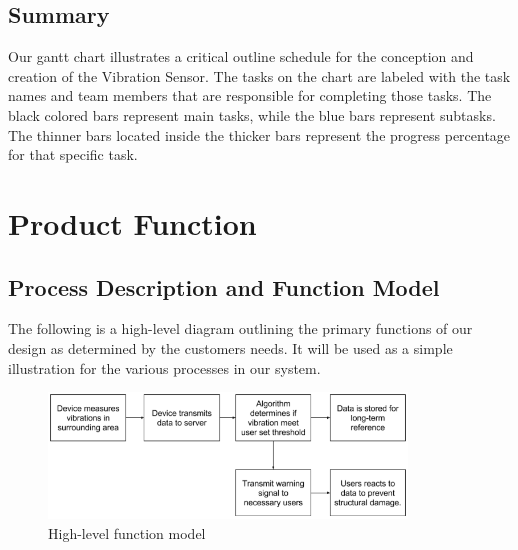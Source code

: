 \documentclass[12pt]{article}
\begin{document}
\subsection{Summary}

Our gantt chart illustrates a critical outline schedule for the conception and creation of the Vibration Sensor. The tasks on the chart are labeled with the task names and team members that are responsible for completing those tasks. The black colored bars represent main tasks, while the blue bars represent subtasks. The thinner bars located inside the thicker bars represent the progress percentage for that specific task.
\newpage
\section{Product Function}
\subsection{Process Description and Function Model}
The following is a high-level diagram outlining the primary functions of our design as determined by the customers needs. It will be used as a simple illustration for the various processes in our system. 
\begin{figure}[ht!]
	\centering
	\includegraphics[width=0.85\textwidth]{functionmodel.png}
	\caption{High-level function model}
	\label{fig:Function Model}
\end{figure}
\end{document}
